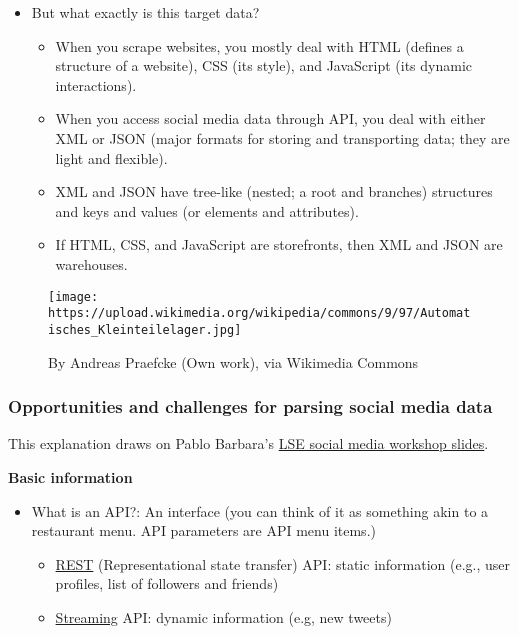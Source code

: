 \documentclass[
]{book}
\begin{document}
\begin{itemize}
\item
  But what exactly is this target data?

  \begin{itemize}
  \item
    When you scrape websites, you mostly deal with HTML (defines a structure of a website), CSS (its style), and JavaScript (its dynamic interactions).
  \item
    When you access social media data through API, you deal with either XML or JSON (major formats for storing and transporting data; they are light and flexible).
  \item
    XML and JSON have tree-like (nested; a root and branches) structures and keys and values (or elements and attributes).
  \item
    If HTML, CSS, and JavaScript are storefronts, then XML and JSON are warehouses.
  \end{itemize}
\end{itemize}

\begin{figure}
\centering
\texttt{[image: https://upload.wikimedia.org/wikipedia/commons/9/97/Automatisches\_Kleinteilelager.jpg]}
\caption{By Andreas Praefcke (Own work), via Wikimedia Commons}
\end{figure}

\hypertarget{opportunities-and-challenges-for-parsing-social-media-data}{%
\subsubsection{Opportunities and challenges for parsing social media data}\label{opportunities-and-challenges-for-parsing-social-media-data}}

This explanation draws on Pablo Barbara's \href{http://pablobarbera.com/social-media-workshop/social-media-slides.pdf}{LSE social media workshop slides}.

\textbf{Basic information}

\begin{itemize}
\item
  What is an API?: An interface (you can think of it as something akin to a restaurant menu. API parameters are API menu items.)

  \begin{itemize}
  \item
    \href{https://en.wikipedia.org/wiki/Representational_state_transfer}{REST} (Representational state transfer) API: static information (e.g., user profiles, list of followers and friends)
  \item
    \href{https://blog.axway.com/amplify/api-management/streaming-apis\#:~:text=Streaming\%20APIs\%20are\%20used\%20to,a\%20subset\%20of\%20Streaming\%20APIS.}{Streaming} API: dynamic information (e.g, new tweets)
  \end{itemize}
\end{itemize}
\end{document}
